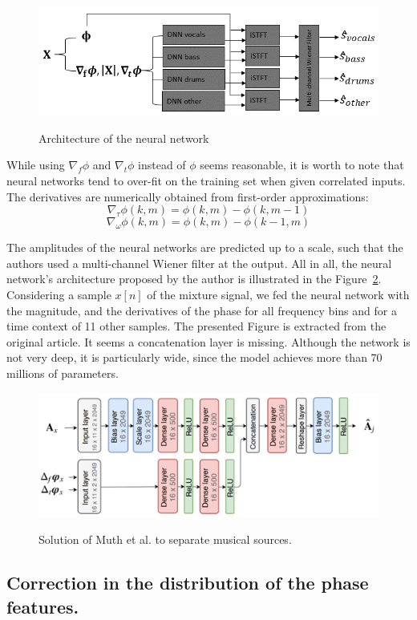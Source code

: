 \begin{figure}
  \centering
  \includegraphics[width=0.8\columnwidth]{nn.png}
  \label{fig:nn}
  \caption{Architecture of the neural network}
\end{figure}


While using $\nabla_f \phi$ and
$\nabla_t \phi$ instead of $\phi$ seems reasonable,
it is worth to note that neural networks tend to over-fit on the training set
when given correlated inputs.
The derivatives are numerically obtained from first-order approximations:
$$\nabla_\tau \phi(k, m) = \phi(k, m) - \phi(k,m-1)$$
$$\nabla_\omega \phi(k, m) = \phi(k, m) - \phi(k-1,m)$$

The amplitudes of the neural networks are predicted up to a scale, such that the authors used a multi-channel Wiener filter at the output.
All in all, the neural network's architecture proposed by the author is
illustrated in the Figure~\ref{fig:orig-nn}. Considering a sample $x[n]$ of the
mixture signal, we fed the neural network with the magnitude, and the derivatives
 of the phase for all frequency bins and for a time context of 11 other samples.
 The presented Figure is extracted from the original article.
 It seems a concatenation layer is missing.
Although the network is not very deep, it is particularly wide,
since the model achieves more than 70 millions of parameters.

\begin{figure}
  \centering
  \includegraphics[width=0.8\columnwidth]{orig-nn.png}
  \label{fig:orig-nn}
  \caption{Solution of Muth et al. to separate musical sources.}
\end{figure}


\subsection{Correction in the distribution of the phase features.}

